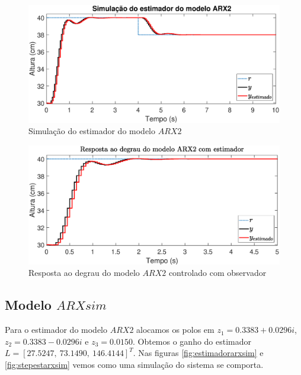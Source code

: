 \begin{figure}[H]
	\centering
	\includegraphics[width=1\linewidth]{estimadorarx2}
	\caption[Simulação do estimador do modelo $ARX2$]{Simulação do estimador do modelo $ARX2$}
	\label{fig:estimadorarx2}
\end{figure}

\begin{figure}[H]
	\centering
	\includegraphics[width=1\linewidth]{stepestarx2}
	\caption[Resposta ao degrau do modelo $ARX2$ controlado com observador]{Resposta ao degrau do modelo $ARX2$ controlado com observador}
	\label{fig:stepestarx2}
\end{figure}

\subsection{Modelo $ARXsim$}\label{s:estarxsim}
Para o estimador do modelo $ARX2$ alocamos os polos em $z_1=0.3383 + 0.0296i$, $z_2=0.3383 - 0.0296i$ e $z_3=0.0150$. Obtemos o ganho do estimador $L=[27.5247,~ 73.1490,~ 146.4144]^T$. Nas figuras \ref{fig:estimadorarxsim} e \ref{fig:stepestarxsim} vemos como uma simulação do sistema se comporta.

